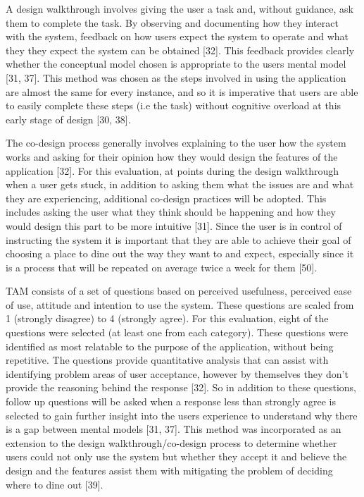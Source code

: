 \documentclass[a4 paper, 12pt]{article}
\begin{document}
A design walkthrough involves giving the user a task and, without guidance, ask them to complete the task. By observing and documenting how they interact with the system, feedback on how users expect the system to operate and what they they expect the system can be obtained [32]. This feedback provides clearly whether the conceptual model chosen is appropriate to the users mental model [31, 37]. This method was chosen as the steps involved in using the application are almost the same for every instance, and so it is imperative that users are able to easily complete these steps (i.e the task) without cognitive overload at this early stage of design [30, 38].

The co-design process generally involves explaining to the user how the system works and asking for their opinion how they would design the features of the application [32]. For this evaluation, at points during the design walkthrough when a user gets stuck, in addition to asking them what the issues are and what they are experiencing, additional co-design practices will be adopted. This includes asking the user what they think should be happening and how they would design this part to be more intuitive [31]. Since the user is in control of instructing the system it is important that they are able to achieve their goal of choosing a place to dine out the way they want to and expect, especially since it is a process that will be repeated on average twice a week for them [50]. 

TAM consists of a set of questions based on perceived usefulness, perceived ease of use, attitude and intention to use the system. These questions are scaled from 1 (strongly disagree) to 4 (strongly agree). For this evaluation, eight of the questions were selected (at least one from each category). These questions were identified as most relatable to the purpose of the application, without being repetitive. The questions provide quantitative analysis that can assist with identifying problem areas of user acceptance, however by themselves they don't provide the reasoning behind the response [32]. So in addition to these questions, follow up questions will be asked when a response less than strongly agree is selected to gain further insight into the users experience to understand why there is a gap between mental models [31, 37]. This method was incorporated as an extension to the design walkthrough/co-design process to determine whether users could not only use the system but whether they accept it and believe the design and the features assist them with mitigating the problem of deciding where to dine out [39].
\end{document}
